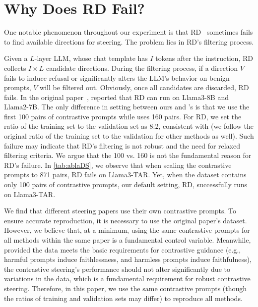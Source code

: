 \documentclass{article}
\theoremstyle{plain}
\theoremstyle{definition}
\theoremstyle{remark}
\begin{document}
\section{Why Does RD Fail?}\label{app:rd}

One notable phenomenon throughout our experiment is that RD~\cite{singleDirection} sometimes fails to find available directions for steering. The problem lies in RD's filtering process.

Given a $L$-layer LLM, whose chat template has $I$ tokens after the instruction, RD collects $I \times L$ candidate directions. During the filtering process, if a direction $V$ fails to induce refusal or significantly alters the LLM's behavior on benign prompts, $V$ will be filtered out. Obviously, once all candidates are discarded, RD fails. In the original paper~\cite{singleDirection}, \citet{singleDirection} reported that RD can run on Llama3-8B and Llama2-7B. The only difference in setting between ours and \citet{singleDirection}'s is that we use the first 100 pairs of contrastive prompts while \citet{singleDirection} uses 160 pairs. For RD, we set the ratio of the training set to the validation set as 8:2, consistent with \citet{singleDirection} (we follow the original ratio of the training set to the validation for other methods as well). Such failure may indicate that RD's filtering is not robust and the need for relaxed filtering criteria. We argue that the 100 vs. 160 is not the fundamental reason for RD's failure. In \cref{tab:ablaDS}, we observe that when scaling the contrastive prompts to 871 pairs, RD fails on Llama3-TAR. Yet, when the dataset contains only 100 pairs of contrastive prompts, our default setting, RD, successfully runs on Llama3-TAR.

We find that different steering papers use their own contrastive prompts. To ensure accurate reproduction, it is necessary to use the original paper’s dataset. However, we believe that, at a minimum, using the same contrastive prompts for all methods within the same paper is a fundamental control variable. Meanwhile, provided the data meets the basic requirements for contrastive guidance (e.g., harmful prompts induce faithlessness, and harmless prompts induce faithfulness), the contrastive steering's performance should not alter significantly due to variations in the data, which is a fundamental requirement for robust contrastive steering. Therefore, in this paper, we use the same contrastive prompts (though the ratios of training and validation sets may differ) to reproduce all methods.
\end{document}
